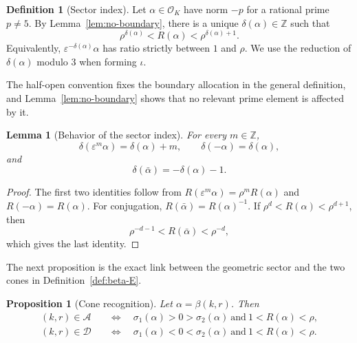 \documentclass[12pt]{amsart}
\newtheorem{proposition}[theorem]{Proposition}
\newtheorem{lemma}[theorem]{Lemma}
\theoremstyle{definition}
\newtheorem{definition}[theorem]{Definition}
\theoremstyle{remark}
\newcommand{\ZZ}{\mathbb{Z}}
\newcommand{\OK}{\mathcal{O}_K}
\newcommand{\eps}{\varepsilon}
\newcommand{\Acone}{\mathcal{A}}
\newcommand{\Dcone}{\mathcal{D}}
\begin{document}
\begin{definition}[Sector index]\label{def:delta}
Let $\alpha\in\OK$ have norm $-p$ for a rational prime $p\neq5$.
By Lemma~\ref{lem:no-boundary}, there is a unique
$\delta(\alpha)\in\ZZ$ such that
\[
  \rho^{\delta(\alpha)}<R(\alpha)<
  \rho^{\delta(\alpha)+1}.
\]
Equivalently, $\eps^{-\delta(\alpha)}\alpha$ has ratio strictly between
$1$ and $\rho$.  We use the reduction of $\delta(\alpha)$ modulo $3$
when forming $\iota$.
\end{definition}

The half-open convention fixes the boundary allocation in the
general definition, and Lemma~\ref{lem:no-boundary} shows that no
relevant prime element is affected by it.

\begin{lemma}[Behavior of the sector index]\label{lem:delta}
For every $m\in\ZZ$,
\[
  \delta(\eps^m\alpha)=\delta(\alpha)+m,
  \qquad
  \delta(-\alpha)=\delta(\alpha),
\]
and
\[
  \delta(\bar\alpha)=-\delta(\alpha)-1.
\]
\end{lemma}

\begin{proof}
The first two identities follow from
$R(\eps^m\alpha)=\rho^mR(\alpha)$ and $R(-\alpha)=R(\alpha)$.  For
conjugation, $R(\bar\alpha)=R(\alpha)^{-1}$.  If
$\rho^d<R(\alpha)<\rho^{d+1}$, then
\[
  \rho^{-d-1}<R(\bar\alpha)<\rho^{-d},
\]
which gives the last identity.
\end{proof}

The next proposition is the exact link between the geometric sector
and the two cones in Definition~\ref{def:beta-E}.

\begin{proposition}[Cone recognition]\label{prop:cone-recognition}
Let $\alpha=\beta(k,r)$.  Then
\begin{align*}
(k,r)\in\Acone
&\quad\Longleftrightarrow\quad
\sigma_1(\alpha)>0>\sigma_2(\alpha)
\ \text{and}\ 1<R(\alpha)<\rho,\\
(k,r)\in\Dcone
&\quad\Longleftrightarrow\quad
\sigma_1(\alpha)<0<\sigma_2(\alpha)
\ \text{and}\ 1<R(\alpha)<\rho.
\end{align*}
\end{proposition}
\end{document}
